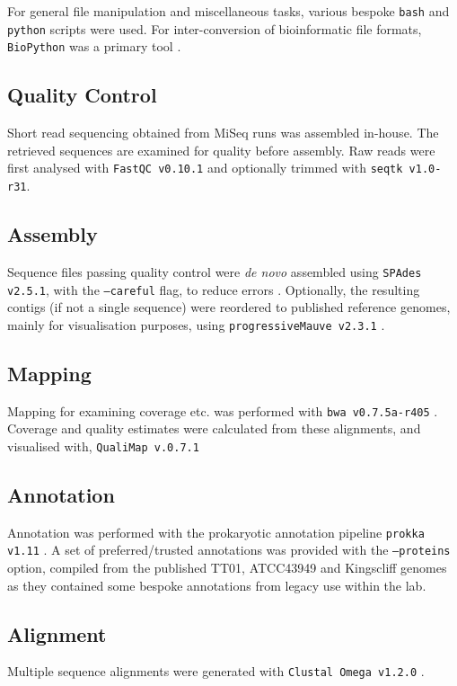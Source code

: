 For general file manipulation and miscellaneous tasks, various bespoke \texttt{bash} and \texttt{python} scripts were used. For inter-conversion of bioinformatic file formats, \texttt{BioPython} was a primary tool \citep{Cock2009}.

\subsection{Quality Control}
Short read sequencing obtained from MiSeq runs was assembled in-house. The retrieved sequences are examined for quality before assembly. Raw reads were first analysed with \texttt{FastQC v0.10.1} and optionally trimmed with \texttt{seqtk v1.0-r31}.

\subsection{Assembly}\label{assembly}
Sequence files passing quality control were \emph{de novo} assembled using \texttt{SPAdes v2.5.1}, with the \texttt{--careful} flag, to reduce errors \citep{Bankevich2012}.  Optionally, the resulting contigs (if not a single sequence) were reordered to published reference genomes, mainly for visualisation purposes, using \texttt{progressiveMauve v2.3.1} \citep{Darling2010}.

\subsection{Mapping}
Mapping for examining coverage etc. was performed with \texttt{bwa v0.7.5a-r405} \citep{Li2009}. Coverage and quality estimates were calculated from these alignments, and visualised with, \texttt{QualiMap v.0.7.1} \citep{Garcia-Alcalde2012}

\subsection{Annotation}\label{prokka}
Annotation was performed with the prokaryotic annotation pipeline \texttt{prokka v1.11} \citep{Seemann2014}. A set of preferred/trusted annotations was provided with the \texttt{--proteins} option, compiled from the published \Plum{} TT01,  \Pasy{} ATCC43949 and \Pasy{} Kingscliff genomes as they contained some bespoke annotations from legacy use within the lab.

\subsection{Alignment}
Multiple sequence alignments were generated with \texttt{Clustal Omega v1.2.0} \citep{Sievers2011}.

